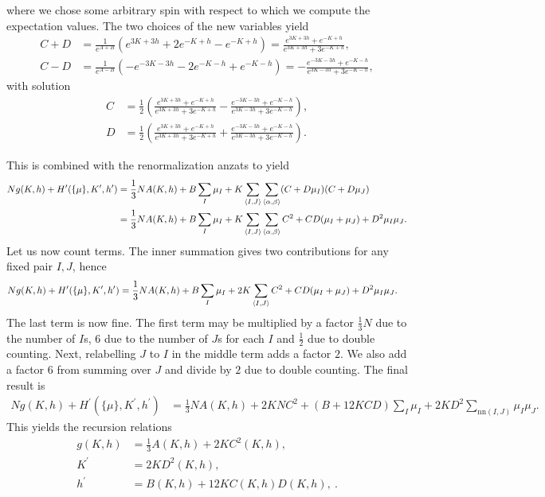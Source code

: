 where we chose some arbitrary spin with respect to which we compute the expectation values. The two choices of the new variables yield
\begin{align*}
	C + D &= \frac{1}{e^{A + B}}(e^{3K + 3h} + 2e^{-K + h} - e^{-K + h}) = \frac{e^{3K + 3h} + e^{-K + h}}{e^{3K + 3h} + 3e^{-K + h}}, \\
	C - D &= \frac{1}{e^{A - B}}(-e^{-3K - 3h} - 2e^{-K - h} + e^{-K - h}) = -\frac{e^{-3K - 3h} + e^{-K - h} }{e^{3K - 3h} + 3e^{-K - h}},
\end{align*}
with solution
\begin{align*}
	C &= \frac{1}{2}\left(\frac{e^{3K + 3h} + e^{-K + h}}{e^{3K + 3h} + 3e^{-K + h}} - \frac{e^{-3K - 3h} + e^{-K - h} }{e^{3K - 3h} + 3e^{-K - h}}\right), \\
	D &= \frac{1}{2}\left(\frac{e^{3K + 3h} + e^{-K + h}}{e^{3K + 3h} + 3e^{-K + h}} + \frac{e^{-3K - 3h} + e^{-K - h} }{e^{3K - 3h} + 3e^{-K - h}}\right).
\end{align*}

This is combined with the renormalization anzats to yield
\begin{align*}
	Ng(K, h) + H^{\prime}(\{\mu\}, K^{\prime}, h^{\prime}) &= \frac{1}{3}NA(K, h) + B\sum\limits_{I}\mu_{I} + K\sum\limits_{\langle I, J\rangle}\sum\limits_{\langle\alpha, \beta\rangle}(C + D\mu_{I})(C + D\mu_{J}) \\
	                                                       &= \frac{1}{3}NA(K, h) + B\sum\limits_{I}\mu_{I} + K\sum\limits_{\langle I, J\rangle}\sum\limits_{\langle\alpha, \beta\rangle}C^{2} + CD(\mu_{I} + \mu_{J}) + D^{2}\mu_{I}\mu_{J}.
\end{align*}
Let us now count terms. The inner summation gives two contributions for any fixed pair $I, J$, hence
\begin{align*}
	Ng(K, h) + H^{\prime}(\{\mu\}, K^{\prime}, h^{\prime}) &= \frac{1}{3}NA(K, h) + B\sum\limits_{I}\mu_{I} + 2K\sum\limits_{\langle I, J\rangle}C^{2} + CD(\mu_{I} + \mu_{J}) + D^{2}\mu_{I}\mu_{J}.
\end{align*}
The last term is now fine. The first term may be multiplied by a factor $\frac{1}{3}N$ due to the number of $I$s, $6$ due to the number of $J$s for each $I$ and $\frac{1}{2}$ due to double counting. Next, relabelling $J$ to $I$ in the middle term adds a factor $2$. We also add a factor $6$ from summing over $J$ and divide by $2$ due to double counting. The final result is
\begin{align*}
	Ng(K, h) + H^{\prime}(\{\mu\}, K^{\prime}, h^{\prime}) &= \frac{1}{3}NA(K, h) + 2KNC^{2} + (B + 12KCD)\sum\limits_{I}\mu_{I} + 2KD^{2}\sum\limits_{\text{nn}(I, J)}\mu_{I}\mu_{J}.
\end{align*}
This yields the recursion relations
\begin{align*}
	g(K, h)    &= \frac{1}{3}A(K, h) + 2KC^{2}(K, h), \\
	K^{\prime} &= 2KD^{2}(K, h), \\
	h^{\prime} &= B(K, h) + 12KC(K, h)D(K, h),\ .
\end{align*}

